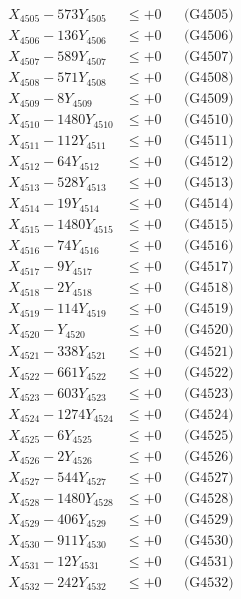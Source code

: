 \documentclass[a4paper,10pt]{article}
\begin{document}
{\begin{align}
X_{4505} - 573Y_{4505} &\leq +0 && \text{(G4505)} \\
X_{4506} - 136Y_{4506} &\leq +0 && \text{(G4506)} \\
X_{4507} - 589Y_{4507} &\leq +0 && \text{(G4507)} \\
X_{4508} - 571Y_{4508} &\leq +0 && \text{(G4508)} \\
X_{4509} - 8Y_{4509} &\leq +0 && \text{(G4509)} \\
X_{4510} - 1480Y_{4510} &\leq +0 && \text{(G4510)} \\
\allowbreak
X_{4511} - 112Y_{4511} &\leq +0 && \text{(G4511)} \\
X_{4512} - 64Y_{4512} &\leq +0 && \text{(G4512)} \\
X_{4513} - 528Y_{4513} &\leq +0 && \text{(G4513)} \\
X_{4514} - 19Y_{4514} &\leq +0 && \text{(G4514)} \\
X_{4515} - 1480Y_{4515} &\leq +0 && \text{(G4515)} \\
X_{4516} - 74Y_{4516} &\leq +0 && \text{(G4516)} \\
X_{4517} - 9Y_{4517} &\leq +0 && \text{(G4517)} \\
X_{4518} - 2Y_{4518} &\leq +0 && \text{(G4518)} \\
X_{4519} - 114Y_{4519} &\leq +0 && \text{(G4519)} \\
X_{4520} - Y_{4520} &\leq +0 && \text{(G4520)} \\
\allowbreak
X_{4521} - 338Y_{4521} &\leq +0 && \text{(G4521)} \\
X_{4522} - 661Y_{4522} &\leq +0 && \text{(G4522)} \\
X_{4523} - 603Y_{4523} &\leq +0 && \text{(G4523)} \\
X_{4524} - 1274Y_{4524} &\leq +0 && \text{(G4524)} \\
X_{4525} - 6Y_{4525} &\leq +0 && \text{(G4525)} \\
X_{4526} - 2Y_{4526} &\leq +0 && \text{(G4526)} \\
X_{4527} - 544Y_{4527} &\leq +0 && \text{(G4527)} \\
X_{4528} - 1480Y_{4528} &\leq +0 && \text{(G4528)} \\
X_{4529} - 406Y_{4529} &\leq +0 && \text{(G4529)} \\
X_{4530} - 911Y_{4530} &\leq +0 && \text{(G4530)} \\
\allowbreak
X_{4531} - 12Y_{4531} &\leq +0 && \text{(G4531)} \\
X_{4532} - 242Y_{4532} &\leq +0 && \text{(G4532)} \\

\end{align}}
\end{document}

